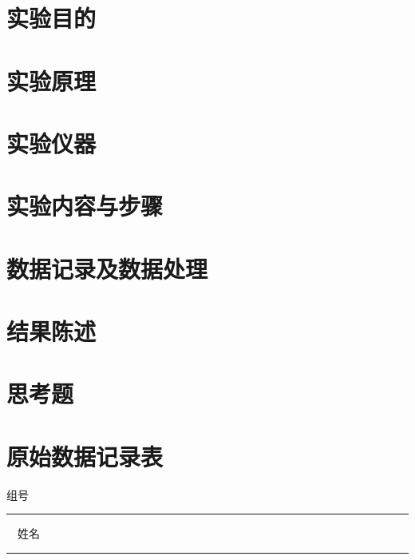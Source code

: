 \documentclass[a4paper,zihao=5,UTF8,fontset=fandol]{phyreport}
\begin{document}
\phyExpCover


\fancypage{\fbox}{} %

\section{实验目的}

\smartLongLine
\section{实验原理}

\smartLongLine
\section{实验仪器}

\smartLongLine
\section{实验内容与步骤}

\smartLongLine
\section{数据记录及数据处理}

\smartLongLine
\section{结果陈述}

\smartLongLine
\section{思考题}

\endBox

\newpage
\thispagestyle{empty}

\fancypage{ }{}
\section*{原始数据记录表}

\noindent 组号 \rule[-5pt]{2cm}{0.4pt} \ \ 姓名 \rule[-5pt]{2cm}{0.4pt}

\end{document}
